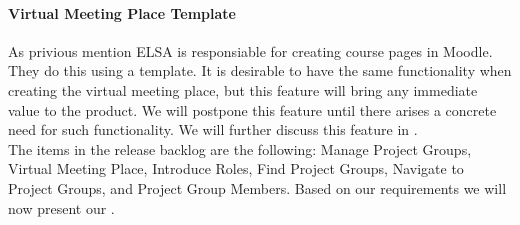 \paragraph{Virtual Meeting Place Template}
As privious mention ELSA is responsiable for creating course pages in Moodle. 
They do this using a template. 
It is desirable to have the same functionality when creating the virtual meeting place, but this feature will bring any immediate value to the product. 
We will postpone this feature until there arises a concrete need for such functionality.
We will further discuss this feature in \secref{}.\\

The items in the release backlog are the following: Manage Project Groups, Virtual Meeting Place, Introduce Roles, Find Project Groups, Navigate to Project Groups, and Project Group Members. 
Based on our requirements we will now present our .


\begin{comment}
In the interview described in \appref{sec:lene} we learned that there is a need for having a concept of project groups in \moodle{}.  to enhance communication by sending messages from the \admpers{} to project groups through \moodle{}.
This evolves into two backlog items; integrate the concept of project groups into \moodle{} and allow the administrative personnel to post messages to the project group.
The former is represented as a backlog item which can be seen in \figref{fig:productbacklog}.
The latter is implemented by the \supervisorgroup{}.
\end{comment}

\FloatBarrier
